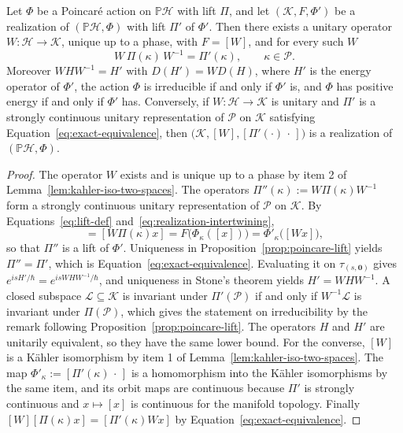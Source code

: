 \begin{proposition}\label{prop:realization-equivalence}
	Let $\Phi$ be a Poincar\'e action on $\mathbb{P}\mathcal{H}$ with lift $\Pi$, and let $(\mathcal{K},F,\Phi')$ be a realization of $(\mathbb{P}\mathcal{H},\Phi)$ with lift $\Pi'$ of $\Phi'$. Then there exists a unitary operator $W:\mathcal{H}\to\mathcal{K}$, unique up to a phase, with $F=[W]$, and for every such $W$
	\begin{equation}\label{eq:exact-equivalence}
		W\,\Pi(\kappa)\,W^{-1}=\Pi'(\kappa),\qquad \kappa\in\mathcal{P}.
	\end{equation}
	Moreover $W H W^{-1}=H'$ with $D(H')=W D(H)$, where $H'$ is the energy operator of $\Phi'$, the action $\Phi$ is irreducible if and only if $\Phi'$ is, and $\Phi$ has positive energy if and only if $\Phi'$ has. Conversely, if $W:\mathcal{H}\to\mathcal{K}$ is unitary and $\Pi'$ is a strongly continuous unitary representation of $\mathcal{P}$ on $\mathcal{K}$ satisfying Equation~\eqref{eq:exact-equivalence}, then $\big(\mathcal{K},[W],[\Pi'(\cdot)\,\cdot\,]\big)$ is a realization of $(\mathbb{P}\mathcal{H},\Phi)$.
\end{proposition}

\begin{proof}
	The operator $W$ exists and is unique up to a phase by item 2 of Lemma~\ref{lem:kahler-iso-two-spaces}. The operators $\Pi''(\kappa):=W\Pi(\kappa)W^{-1}$ form a strongly continuous unitary representation of $\mathcal{P}$ on $\mathcal{K}$. By Equations~\eqref{eq:lift-def} and~\eqref{eq:realization-intertwining},
	\begin{equation*}
		[\Pi''(\kappa)Wx]=[W\Pi(\kappa)x]=F\big(\Phi_\kappa([x])\big)=\Phi'_\kappa\big([Wx]\big),
	\end{equation*}
	so that $\Pi''$ is a lift of $\Phi'$. Uniqueness in Proposition~\ref{prop:poincare-lift} yields $\Pi''=\Pi'$, which is Equation~\eqref{eq:exact-equivalence}. Evaluating it on $\tau_{(s,\mathbf{0})}$ gives $e^{isH'/\hbar}=e^{isWHW^{-1}/\hbar}$, and uniqueness in Stone's theorem yields $H'=WHW^{-1}$. A closed subspace $\mathcal{L}\subseteq\mathcal{K}$ is invariant under $\Pi'(\mathcal{P})$ if and only if $W^{-1}\mathcal{L}$ is invariant under $\Pi(\mathcal{P})$, which gives the statement on irreducibility by the remark following Proposition~\ref{prop:poincare-lift}. The operators $H$ and $H'$ are unitarily equivalent, so they have the same lower bound. For the converse, $[W]$ is a Kähler isomorphism by item 1 of Lemma~\ref{lem:kahler-iso-two-spaces}. The map $\Phi'_\kappa:=[\Pi'(\kappa)\,\cdot\,]$ is a homomorphism into the Kähler isomorphisms by the same item, and its orbit maps are continuous because $\Pi'$ is strongly continuous and $x\mapsto[x]$ is continuous for the manifold topology. Finally $[W][\Pi(\kappa)x]=[\Pi'(\kappa)Wx]$ by Equation~\eqref{eq:exact-equivalence}.
\end{proof}

